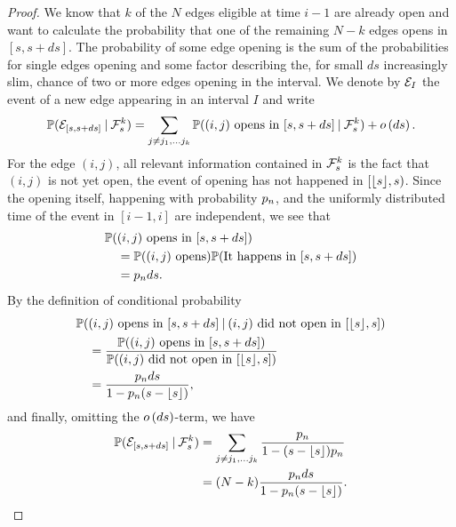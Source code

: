 \begin{proof}
	We know that $k$ of the $N$ edges eligible at time $i-1$ are already open 
	and want to calculate the probability that one of the remaining $N-k$ edges opens in $[s, s+ds]$.
	The probability of some edge opening is the sum of the probabilities for single edges opening
	and some factor describing the, for small $ds$ increasingly slim, 
	chance of two or more edges opening in the interval.
	We denote by $\mathcal{E}_{I}$ the event of a new edge appearing in an interval $I$ and write
	\begin{equation}
	\mathbb{P}(\mathcal{E}_{[s,s+ds]} \: | \: \mathcal{F}_s^k)
	= \sum_{j \neq j_1, \dots j_k} \mathbb{P}( \text{$(i,j)$ opens in $[s, s+ds]$} \: | \: \mathcal{F}_s^k ) + o\left(ds\right).
	\end{equation}
	For the edge $(i,j)$, all relevant information contained in $\mathcal{F}_s^k$ is the fact that 
	$(i,j)$ is not yet open, the event of opening has not happened in $[\lfloor s\rfloor, s)$.
	Since the opening itself, happening with probability $p_n$,
	and the uniformly distributed time of the event in $[i-1, i]$ are independent,
	we see that
	\begin{equation}
	\begin{aligned}
	&\mathbb{P}(\text{$(i,j)$ opens in $[s, s+ds]$}) \\
	&\quad = \mathbb{P}(\text{$(i,j)$ opens})\mathbb{P}(\text{It happens in $[s, s+ds]$}) \\
	&\quad = p_n ds.
	\end{aligned}
	\end{equation}
	By the definition of conditional probability
	\begin{equation}
	\begin{aligned}
	&\mathbb{P}( \text{$(i,j)$ opens in $[s, s+ds]$} \: | \: \text{$(i,j)$ did not open in $[\lfloor s\rfloor, s]$} ) \\
	&\quad = \frac{\mathbb{P}( \text{$(i,j)$ opens in $[s, s+ds]$})}{\mathbb{P}(\text{$(i,j)$ did not open in $[\lfloor s\rfloor, s]$})} \\
	&\quad = \frac{p_n ds}{1-p_n(s-\lfloor s\rfloor)},
	\end{aligned}
	\end{equation}
	and finally, omitting the $o\left(ds\right)$-term, we have
	\begin{equation}
	\begin{aligned}
	\mathbb{P}(\mathcal{E}_{[s,s+ds]} \: | \: \mathcal{F}_s^k) 
	&= \sum_{j \neq j_1, \dots j_k} \frac{p_n}{1-(s-\lfloor s\rfloor)p_n} \\
	&= (N-k) \frac{p_n ds}{1-p_n(s-\lfloor s\rfloor)}.
	\end{aligned}
	\end{equation}

\end{proof}
